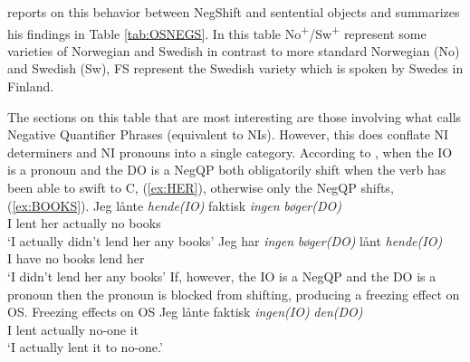 \documentclass[12pt, letterpaper]{article}
\begin{document}
\citet{christensenInterfacesNegationSyntax2005} reports on this behavior between NegShift and sentential objects and summarizes his findings in Table \ref{tab:OSNEGS}. In this table No\textsuperscript{+}/Sw\textsuperscript{+} represent some varieties of Norwegian and Swedish in contrast to more standard Norwegian (No) and Swedish (Sw), FS represent the Swedish variety which is spoken by Swedes in Finland.

The sections on this table that are most interesting are those involving what \citeauthor{christensenInterfacesNegationSyntax2005} calls Negative Quantifier Phrases (equivalent to NIs). However, this does conflate NI determiners and NI pronouns into a single category. According to \citeauthor{christensenInterfacesNegationSyntax2005}, when the IO is a pronoun and the DO is a NegQP both obligatorily shift when the verb has been able to swift to C, (\ref{ex:HER}), otherwise only the NegQP shifts, (\ref{ex:BOOKS}).
	\ea 
		\ea \label{ex:HER}
		{\gll Jeg lånte \textit{hende(IO)} faktisk \textit{ingen} \textit{bøger(DO)}\\
		I lent her actually no books\\}
		\glt `I actually didn't lend her any books'
		\ex \label{ex:BOOKS}
		\gll Jeg har \textit{ingen} \textit{bøger(DO)} lånt \textit{hende(IO)}\\
		I have no books lend her\\
		\glt `I didn't lend her any books'
		\z 
	\z 
If, however, the IO is a NegQP and the DO is a pronoun then the pronoun is blocked from shifting, producing a freezing effect on OS. 
	\ea Freezing effects on OS
		\ea 
		{\gll Jeg lånte faktisk \textit{ingen(IO)} \textit{den(DO)}\\
		I lent actually no-one it\\}
		\glt `I actually lent it to no-one.'
		\z 
	\z
\end{document}
